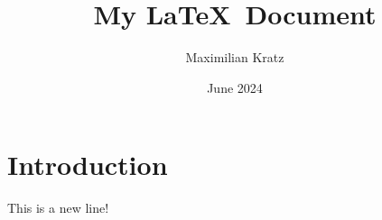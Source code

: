 \documentclass{article}
\title{My \LaTeX~Document}
\author{Maximilian Kratz}
\date{June 2024}
\begin{document}
\maketitle

\section{Introduction}
This is a new line!
\end{document}
